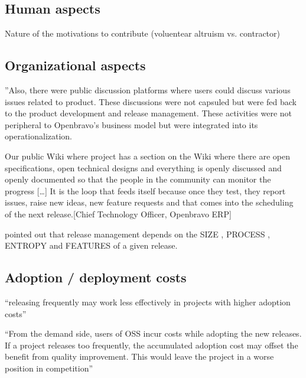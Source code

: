 \subsection{Human aspects}

Nature of the motivations to contribute (voluentear altruism vs. contractor)


\subsection{Organizational aspects}

''Also, there were public discussion platforms where users could discuss various issues related to product. These discussions were not capsuled but were fed back to the product development and release management. These activities were not peripheral to Openbravo’s business model but were integrated into its operationalization.




    Our public Wiki where project has a section on the Wiki where there are open specifications, open technical designs and everything is openly discussed and openly documented so that the people in the community can monitor the progress […] It is the loop that feeds itself because once they test, they report issues, raise new ideas, new feature requests and that comes into the scheduling of the next release.[Chief Technology Officer, Openbravo ERP] \citep{DeodharSaxena_et_al2012}
    
    
    \citet{Krishnan1994}  pointed out that release management depends on the SIZE , PROCESS , ENTROPY and FEATURES of a given release. 
    

    
    \subsection{Adoption / deployment costs}
    
    ``releasing frequently may work less effectively in projects with higher adoption costs'' \citep{ChenKrishnan_et_al2013}
    
    
    ``From  the  demand  side,  users  of  OSS  incur  costs  while  adopting  the  new  releases.  If  a  project  releases  too 
frequently,  the  accumulated  adoption  cost  may  offset  the  benefit  from  quality  improvement.  This 
would leave the project in a worse position in competition'' \citep{ChenKrishnan_et_al2013}


 
    
